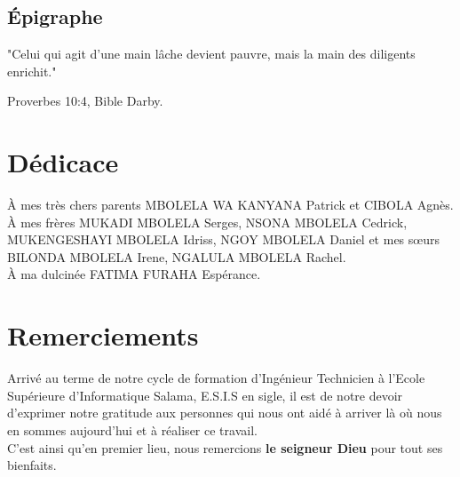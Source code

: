 \documentclass[a4paper,12pt]{report}
\begin{document}
    \newpage

    

    \begin{center}
        \chapter*{Épigraphe}
        \vspace{50pt}
         "Celui qui agit d'une main lâche devient pauvre, mais la main des diligents enrichit."
        \begin{flushright}
            Proverbes 10:4, Bible Darby.
        \end{flushright}
    \end{center}

    

    \chapter*{Dédicace}
    
    \begin{em}
        À mes très chers parents MBOLELA WA KANYANA Patrick \-et CIBOLA Agnès.
        \\
        À mes frères MUKADI MBOLELA Serges, NSONA MBOLELA Cedrick, MUKENGESHAYI MBOLELA Idriss,
        NGOY MBOLELA Daniel et mes sœurs BILONDA MBOLELA Irene, NGALULA MBOLELA Rachel.
        \\
        À ma dulcinée FATIMA FURAHA Espérance.    
    \end{em}
        
    

    
    \chapter*{Remerciements}
    

    Arrivé au terme de notre cycle de formation d’Ingénieur Technicien à l’Ecole Supérieure d’Informatique Salama, 
    E.S.I.S en sigle, il est de notre devoir d’exprimer notre gratitude aux personnes qui nous ont aidé à 
    arriver là où nous en sommes aujourd’hui et à réaliser ce travail.
    \\
    C’est ainsi qu’en premier lieu, nous remercions \textbf{le seigneur Dieu} pour tout ses bienfaits.
    \\
    
\end{document}
